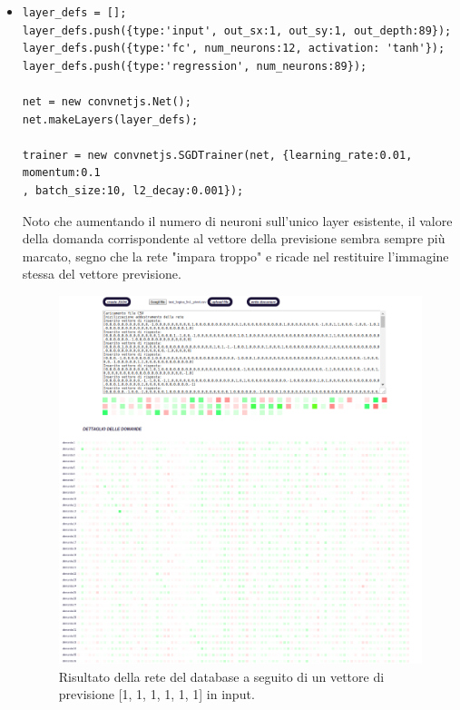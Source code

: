 \begin{itemize}
\item \begin{verbatim}
layer_defs = [];
layer_defs.push({type:'input', out_sx:1, out_sy:1, out_depth:89});
layer_defs.push({type:'fc', num_neurons:12, activation: 'tanh'});
layer_defs.push({type:'regression', num_neurons:89});

net = new convnetjs.Net();
net.makeLayers(layer_defs);

trainer = new convnetjs.SGDTrainer(net, {learning_rate:0.01, momentum:0.1
, batch_size:10, l2_decay:0.001});
\end{verbatim}
Noto che aumentando il numero di neuroni sull'unico layer esistente, il valore della domanda corrispondente al vettore della previsione sembra sempre pi\`u marcato, segno che la rete "impara troppo" e ricade nel restituire l'immagine stessa del vettore previsione.

\begin{figure}[H]
\centering
	\includegraphics[width=0.90\linewidth]{./image/rete_db-vp1architettura2.png}
	\caption{Risultato della rete del database a seguito di un vettore di previsione [1, 1, 1, 1, 1, 1] in input.}
	\label{Risultato della rete del database a seguito di un vettore di previsione [1, 1, 1, 1, 1, 1] in input.}
\end{figure}


\end{itemize}
